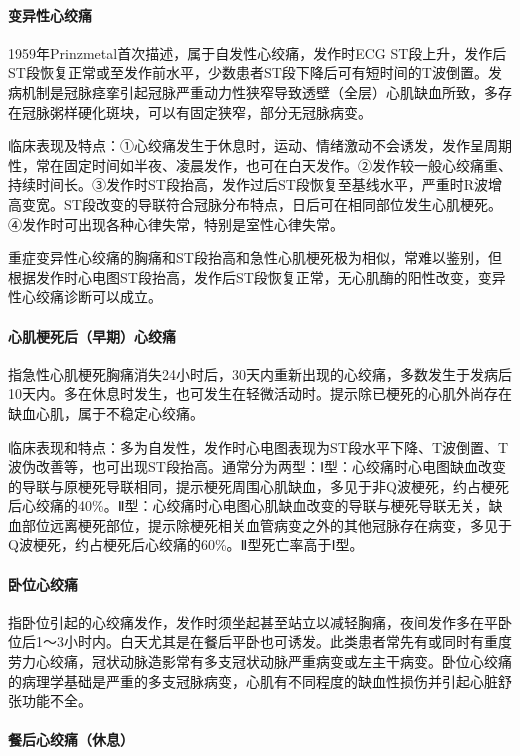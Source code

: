 \paragraph{变异性心绞痛}

1959年Prinzmetal首次描述，属于自发性心绞痛，发作时ECG
ST段上升，发作后ST段恢复正常或至发作前水平，少数患者ST段下降后可有短时间的T波倒置。发病机制是冠脉痉挛引起冠脉严重动力性狭窄导致透壁（全层）心肌缺血所致，多存在冠脉粥样硬化斑块，可以有固定狭窄，部分无冠脉病变。

临床表现及特点：①心绞痛发生于休息时，运动、情绪激动不会诱发，发作呈周期性，常在固定时间如半夜、凌晨发作，也可在白天发作。②发作较一般心绞痛重、持续时间长。③发作时ST段抬高，发作过后ST段恢复至基线水平，严重时R波增高变宽。ST段改变的导联符合冠脉分布特点，日后可在相同部位发生心肌梗死。④发作时可出现各种心律失常，特别是室性心律失常。

重症变异性心绞痛的胸痛和ST段抬高和急性心肌梗死极为相似，常难以鉴别，但根据发作时心电图ST段抬高，发作后ST段恢复正常，无心肌酶的阳性改变，变异性心绞痛诊断可以成立。

\paragraph{心肌梗死后（早期）心绞痛}

指急性心肌梗死胸痛消失24小时后，30天内重新出现的心绞痛，多数发生于发病后10天内。多在休息时发生，也可发生在轻微活动时。提示除已梗死的心肌外尚存在缺血心肌，属于不稳定心绞痛。

临床表现和特点：多为自发性，发作时心电图表现为ST段水平下降、T波倒置、T波伪改善等，也可出现ST段抬高。通常分为两型：Ⅰ型：心绞痛时心电图缺血改变的导联与原梗死导联相同，提示梗死周围心肌缺血，多见于非Q波梗死，约占梗死后心绞痛的40\%。Ⅱ型：心绞痛时心电图心肌缺血改变的导联与梗死导联无关，缺血部位远离梗死部位，提示除梗死相关血管病变之外的其他冠脉存在病变，多见于Q波梗死，约占梗死后心绞痛的60\%。Ⅱ型死亡率高于Ⅰ型。

\paragraph{卧位心绞痛}

指卧位引起的心绞痛发作，发作时须坐起甚至站立以减轻胸痛，夜间发作多在平卧位后1～3小时内。白天尤其是在餐后平卧也可诱发。此类患者常先有或同时有重度劳力心绞痛，冠状动脉造影常有多支冠状动脉严重病变或左主干病变。卧位心绞痛的病理学基础是严重的多支冠脉病变，心肌有不同程度的缺血性损伤并引起心脏舒张功能不全。

\paragraph{餐后心绞痛（休息）}


